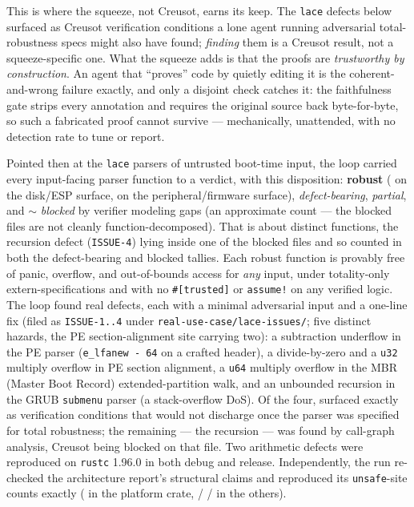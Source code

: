 \documentclass[11pt]{article}
\newcommand{\code}[1]{\texttt{#1}}
\begin{document}
This is where the squeeze, not Creusot, earns its keep. The \code{lace} defects below surfaced
as Creusot verification conditions a lone agent running adversarial total-robustness specs might
also have found; \emph{finding} them is a Creusot result, not a squeeze-specific one. What the
squeeze adds is that the proofs are \emph{trustworthy by construction}. An agent that ``proves''
code by quietly editing it is the coherent-and-wrong failure exactly, and only a disjoint check
catches it: the faithfulness gate strips every annotation and requires the original source back
byte-for-byte, so such a fabricated proof cannot survive --- mechanically, unattended, with no
detection rate to tune or report.

Pointed then at the \code{lace} parsers of untrusted boot-time input, the loop carried every
input-facing parser function to a verdict, with this disposition: \ResRWRobust{}
\textbf{robust} (\ResRWRobustPOne{} on the disk/ESP surface, \ResRWRobustPTwo{} on the
peripheral/firmware surface), \ResRWBugsNum{} \emph{defect-bearing}, \ResRWPartial{}
\emph{partial}, and ${\sim}$\ResRWBlocked{} \emph{blocked} by verifier modeling gaps
(an approximate count --- the blocked files are not cleanly function-decomposed). That is
about \ResRWDistinctFns{} distinct functions, the recursion defect (\code{ISSUE-4}) lying
inside one of the blocked files and so counted in both the defect-bearing and blocked tallies.
Each robust function is provably free of panic,
overflow, and out-of-bounds access for \emph{any} input, under totality-only
extern-specifications and with no \code{\#[trusted]} or \code{assume!} on any
verified logic. The loop found \ResRWBugsNum{} real defects, each with a minimal
adversarial input and a one-line fix (filed as \code{ISSUE-1..4} under
\code{real-use-case/lace-issues/}; five distinct hazards, the PE section-alignment
site carrying two): a subtraction underflow in the PE parser
(\code{e\_lfanew - 64} on a crafted header), a divide-by-zero and a \texttt{u32}
multiply overflow in PE section alignment, a \texttt{u64} multiply overflow in the
MBR (Master Boot Record) extended-partition walk, and an unbounded recursion in the GRUB \code{submenu}
parser (a stack-overflow DoS). Of the four, \ResRWBugsVC{} surfaced exactly as
verification conditions that would not discharge once the parser was specified for
total robustness; the remaining \ResRWBugsCallGraph{} --- the recursion --- was found
by call-graph analysis, Creusot being blocked on that file. Two arithmetic
defects were reproduced on \code{rustc} 1.96.0 in both debug and release.
Independently, the run re-checked the architecture report's structural claims and
reproduced its \code{unsafe}-site counts exactly (\ResRWUnsafePlatform{} in the
platform crate, \ResRWUnsafeUtil{} / \ResRWUnsafeStubble{} / \ResRWUnsafeSpeedboot{}
in the others).
\end{document}
